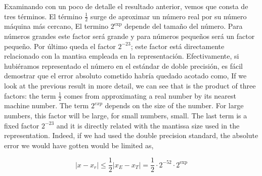 \begin{paracol}{2}
Examinando con un poco de detalle el resultado anterior, vemos que consta de tres términos. El término $\frac{1}{2}$ surge de aproximar un número real por su número máquina más cercano, El termino $2^\text{exp}$ depende del tamaño del número. Para números grandes este factor será grande y para números pequeños será un factor pequeño. Por último queda el factor $2^{-23}$;  este factor está directamente relacionado con la mantisa empleada en la representación. Efectivamente, si hubiéramos  representado el número en el estándar de doble precisión, es fácil demostrar que el error absoluto cometido habría quedado acotado como,
\switchcolumn
If we look at the previous result in more detail, we can see that is the product of three factors: the term $\frac{1}{2}$ comes from approximating a real number by its nearest machine number. The term $2^{exp}$ depends on the size of the number. For large numbers, this factor will be large, for small numbers, small. The last term is a fixed factor $2^{-23}$ and it is directly related with the mantissa size used in the representation. Indeed, if we had used the double precision standard, the absolute error we would have gotten would be limited as,  
\end{paracol}
 \begin{equation*}
\vert x-x_r \vert \leq \frac{1}{2}\vert x_E-x_T \vert= \frac{1}{2}\cdot 2^{-52}\cdot 2^\text{exp}
\end{equation*}

